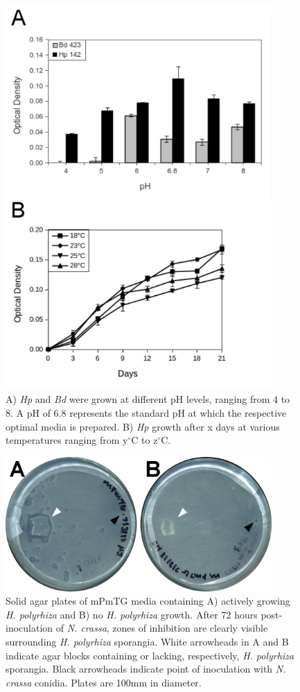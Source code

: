 \begin{figure}[hb]
  \centering
  \includegraphics[width=4in]{./Chapter_Inhibition/img/HpBd_pHTempAssay.png}
  \caption[\textit{Hp} is more tolerant of environmental stresses than \textit{Bd}.]{A) \textit{Hp} and \textit{Bd} were grown at different pH levels, ranging from 4 to 8. A pH of 6.8 represents the standard pH at which the respective optimal media is prepared. B) \textit{Hp} growth after x days at various temperatures ranging from y$^{\circ}$C to z$^{\circ}$C.}
  \label{fig:ChInhib_HpBdpHTemp}
\end{figure}

\begin{figure}[hb]
  \centering
  \includegraphics[width=4in]{./Chapter_Inhibition/img/HpNc_avoidance.png}
  \caption[\textit{N. crassa} displays no avoidance behavior of solid agar blocks.]{Solid agar plates of mPmTG media containing A) actively growing \textit{H. polyrhiza} and B) no \textit{H. polyrhiza} growth. After 72 hours post-inoculation of \textit{N. crassa}, zones of inhibition are clearly visible surrounding \textit{H. polyrhiza} sporangia. White arrowheads in A and B indicate agar blocks containing or lacking, respectively, \textit{H. polyrhiza} sporangia. Black arrowheads indicate point of inoculation with \textit{N. crassa} conidia. Plates are 100mm in diameter.}
  \label{fig:ChInhib_NcAvoidance}
\end{figure}

